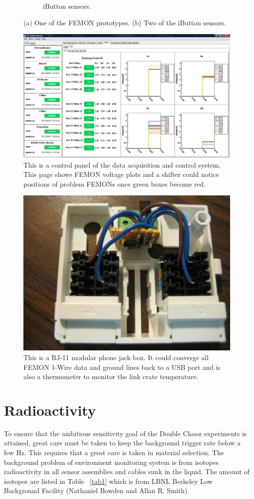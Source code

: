 \documentclass{JINST}
\begin{document}
\begin{figure}
\begin{subfigure}[b]{0.5\textwidth}
                \caption{iButton sensors.}
                \label{fig10b}
        \end{subfigure}

        \caption{(a) One of the FEMON prototypes. (b) Two of the iButton sensors.  }\label{figure10}
\end{figure}
\begin{figure}
\centering
\includegraphics[width=.6\textwidth]{DC.jpg}
\caption{This is a control panel of the data acquisition and control system. This page shows FEMON voltage plots and a shifter could notice positions of problem FEMONs once green boxes become red.}
\label{fig12}
\end{figure}
\begin{figure}
\centering
\includegraphics[width=.4\textwidth]{IMG_3649.JPG}
\caption{This is a RJ-11 modular phone jack box. It could converge all FEMON 1-Wire data and ground lines back to a USB port and is also a thermometer to monitor the link crate temperature.}
\label{fig13}
\end{figure}
\section{Radioactivity}
To ensure that the ambitious sensitivity goal of the Double Chooz experiments is attained, great care must be taken to keep the background trigger rate below a few Hz. This requires that a great care is taken in material selection. The background problem of environment monitoring system is from isotopes radioactivity in all sensor assemblies and cables sunk in the liquid. The amount of isotopes are listed in Table ~\ref{tab1} which is from LBNL Berkeley Low Background Facility (Nathaniel Bowden and Allan R. Smith).
\end{document}
